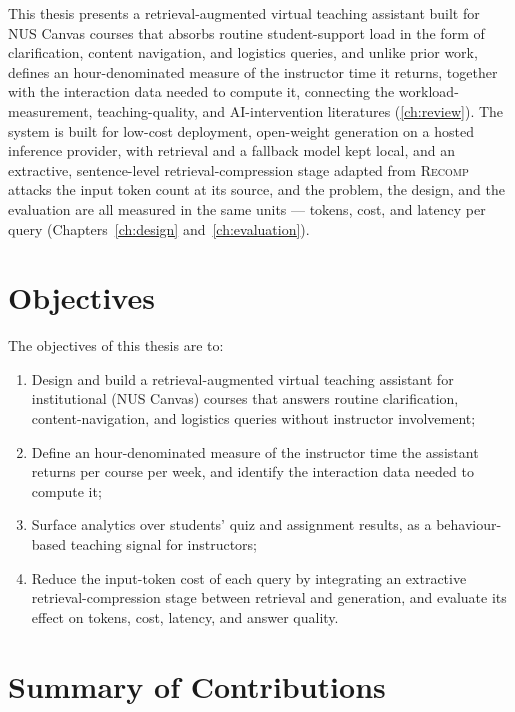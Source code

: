 This thesis presents a retrieval-augmented virtual teaching assistant built
for NUS Canvas courses that absorbs routine student-support load
in the form of clarification, content navigation, and logistics queries, and unlike
prior work, defines an hour-denominated measure of the instructor time it
returns, together with the interaction data needed to compute it, connecting
the workload-measurement, teaching-quality, and AI-intervention literatures
(\autoref{ch:review}). The system is built for low-cost deployment,
open-weight generation on a hosted inference provider, with retrieval and a
fallback model kept local, and an extractive, sentence-level
retrieval-compression stage adapted from
\textsc{Recomp}~\cite{iclr24:Xu} attacks the input token count at its source,
and the problem, the design, and the evaluation are all measured in the same
units --- tokens, cost, and latency per query
(Chapters~\ref{ch:design} and~\ref{ch:evaluation}).

\section{Objectives}
\label{intro:sec:objectives}

The objectives of this thesis are to:
\begin{enumerate}[label=(\roman*)]
    \item Design and build a retrieval-augmented virtual teaching assistant
          for institutional (NUS Canvas) courses that answers
          routine clarification, content-navigation, and logistics queries
          without instructor involvement;
    \item Define an hour-denominated measure of the instructor time the
          assistant returns per course per week, and identify the
          interaction data needed to compute it;
    \item Surface analytics over students' quiz and assignment results, as a
          behaviour-based teaching signal for instructors;
    \item Reduce the input-token cost of each query by integrating an
          extractive retrieval-compression stage between retrieval and
          generation, and evaluate its effect on tokens, cost, latency, and
          answer quality.
\end{enumerate}

\section{Summary of Contributions}
\label{intro:sec:contributions}

